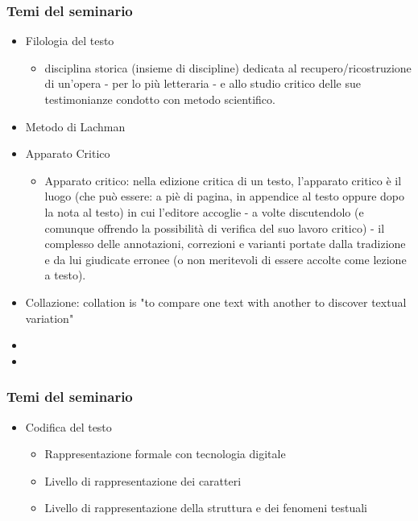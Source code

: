 \documentclass{beamer}
\begin{document}
\begin{frame}
	\frametitle{Temi del seminario}
	\addtocounter{nframe}{1}

	\begin{itemize}
		\item Filologia del testo 
		\begin{itemize}
			\item disciplina storica (insieme di discipline) dedicata al recupero/ricostruzione di un'opera - per lo più letteraria - e allo studio critico delle sue testimonianze condotto con metodo scientifico.
		\end{itemize}
		\item Metodo di Lachman
		\item Apparato Critico
		\begin{itemize}
			\item Apparato critico: nella edizione critica di un testo, l'apparato critico è il luogo (che può essere: a piè di pagina, in appendice al testo oppure dopo la nota al testo) in cui l'editore accoglie - a volte discutendolo (e comunque offrendo la possibilità di verifica del suo lavoro critico) - il complesso delle annotazioni, correzioni e varianti portate dalla tradizione e da lui giudicate erronee (o non meritevoli di essere accolte come lezione a testo).	
		\end{itemize}
		\item Collazione: collation is "to compare one text with another to discover textual variation"
		\item 
		\item 
	\end{itemize}

\end{frame}


\begin{frame}
	\frametitle{Temi del seminario}
	\addtocounter{nframe}{1}

	\begin{itemize}
		\item Codifica del testo 
		\begin{itemize}
			\item Rappresentazione formale con tecnologia digitale
			\item Livello di rappresentazione dei caratteri
			\item Livello di rappresentazione della struttura e dei fenomeni testuali
		\end{itemize}
	\end{itemize}

\end{frame}
\end{document}
